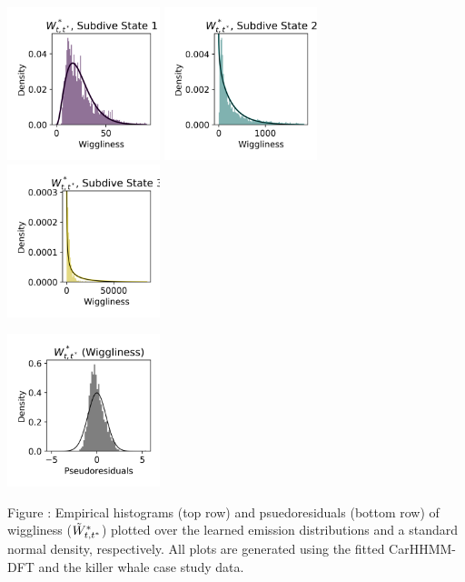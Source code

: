 \documentclass{article}
\begin{document}
        \begin{center}
        \includegraphics[width=1.75in]{../Plots/CarHHMM2_empirical_hist_ahat_0.png}
        \includegraphics[width=1.75in]{../Plots/CarHHMM2_empirical_hist_ahat_1.png}
        \includegraphics[width=1.75in]{../Plots/CarHHMM2_empirical_hist_ahat_2.png}
        
        \includegraphics[width=1.75in]{../Plots/CarHHMM2_psedoresids_ahat.png}
        \end{center}
        
        \noindent Figure : Empirical histograms (top row) and psuedoresiduals (bottom row) of wiggliness ($\tilde{W}^*_{t,t^*}$) plotted over the learned emission distributions and a standard normal density, respectively. All plots are generated using the fitted CarHHMM-DFT and the killer whale case study data.
        \addtocounter{fignum}{1}
        
\end{document}
